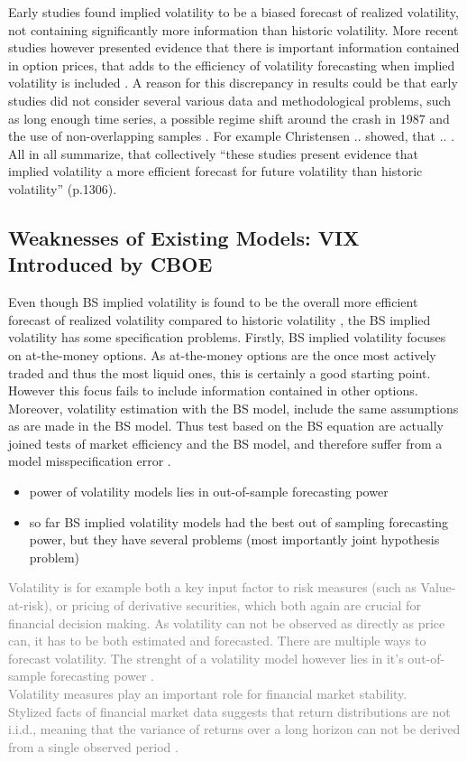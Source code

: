Early studies found implied volatility to be a biased forecast of realized volatility, not containing significantly more information than historic volatility. More recent studies however presented evidence that there is important information contained in option prices, that adds to the efficiency of volatility forecasting when implied volatility is included \parencite{jiang2003}. A reason for this discrepancy in results could be that early studies did not consider several various data and methodological problems, such as long enough time series, a possible regime shift around the crash in 1987 and the use of non-overlapping samples \parencite{jiang2003}. For example Christensen .. showed, that .. . All in all \citeauthor{jiang2003} summarize, that collectively ``these studies present evidence that implied volatility a more efficient forecast for future volatility than historic volatility'' (p.1306).

\subsection{Weaknesses of Existing Models: VIX Introduced by CBOE}
Even though BS implied volatility is found to be the overall more efficient forecast of realized volatility compared to historic volatility \parencite{jiang2003}, the BS implied volatility has some specification problems. Firstly, BS implied volatility focuses on at-the-money options. As at-the-money options are the once most actively traded and thus the most liquid ones, this is certainly a good starting point. However this focus fails to include information contained in other options. Moreover, volatility estimation with the BS model, include the same assumptions as are made in the BS model. Thus test based on the BS equation are actually joined tests of market efficiency and the BS model, and therefore suffer from a model misspecification error \parencite{jiang2003}.

\begin{itemize}\itemsep0pt
\item power of volatility models lies in out-of-sample forecasting power
\item so far BS implied volatility models had the best out of sampling forecasting power, but they have several problems (most importantly joint hypothesis problem) 
\end{itemize}

\textcolor{gray}{
Volatility is for example both a key input factor to risk measures (such as Value-at-risk), or pricing of derivative securities, which both again are crucial for financial decision making. As volatility can not be observed as directly as price can, it has to be both estimated and forecasted. There are multiple ways to forecast volatility. The strenght of a volatility model however lies in it's out-of-sample forecasting power \parencite{poon2003}. \\
Volatility measures play an important role for financial market stability.\\
Stylized facts of financial market data suggests that return distributions are not i.i.d., meaning that the variance of returns over a long horizon can not be derived from a single observed period \parencite{poon2003}. }


